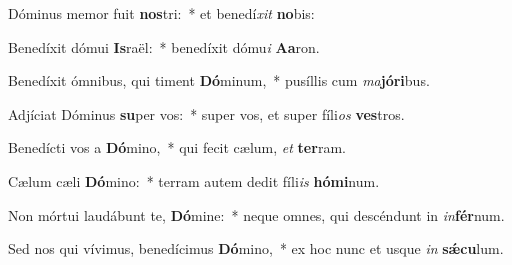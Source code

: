 \item Dóminus memor fuit \textbf{nos}tri:~* et benedí\textit{xit} \textbf{no}bis:
\item Benedíxit dómui \textbf{Is}raël:~* benedíxit dómu\textit{i} \textbf{A}\textbf{a}ron.
\item Benedíxit ómnibus, qui timent \textbf{Dó}minum,~* pusíllis cum \textit{ma}\textbf{jó}\textbf{ri}bus.
\item Adjíciat Dóminus \textbf{su}per vos:~* super vos, et super fíli\textit{os} \textbf{ves}tros.
\item Benedícti vos a \textbf{Dó}mino,~* qui fecit cælum, \textit{et} \textbf{ter}ram.
\item Cælum cæli \textbf{Dó}mino:~* terram autem dedit fíli\textit{is} \textbf{hó}\textbf{mi}num.
\item Non mórtui laudábunt te, \textbf{Dó}mine:~* neque omnes, qui descéndunt in \textit{in}\textbf{fér}num.
\item Sed nos qui vívimus, benedícimus \textbf{Dó}mino,~* ex hoc nunc et usque \textit{in} \textbf{sǽ}\textbf{cu}lum.
